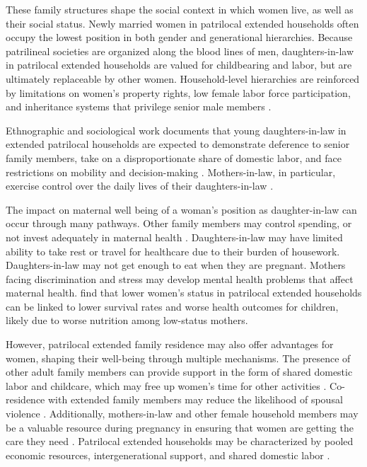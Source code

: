 \documentclass[10pt,twoside,reqno]{article}
\begin{document}
These family structures shape the social context in which women live, as well as their social status. Newly married women in patrilocal extended households often occupy the lowest position in both gender and generational hierarchies. Because patrilineal societies are organized along the blood lines of men, daughters-in-law in patrilocal extended households are valued for childbearing and labor, but are ultimately replaceable by other women. Household-level hierarchies are reinforced by limitations on women's property rights, low female labor force participation, and inheritance systems that privilege senior male members \citep{afridi2018fewer, mookerjee2019gender, reed2020labor}.

Ethnographic and sociological work documents that young daughters-in-law in extended patrilocal households are expected to demonstrate deference to senior family members, take on a disproportionate share of domestic labor, and face restrictions on mobility and decision-making \citep{mandelbaum1988women, jeffery1989labour, gupta1999lifeboat}.  Mothers-in-law, in particular, exercise control over the daily lives of their daughters-in-law \citep{desai2005women, bloom2001dimensions}. 

The impact on maternal well being of a woman's position as daughter-in-law can occur through many pathways. Other family members may control spending, or not invest adequately in maternal health \citep{ganle2015intra,raj2011abuse}. Daughters-in-law may have limited ability to take rest or travel for healthcare due to their burden of housework. Daughters-in-law may not get enough to eat when they are pregnant. Mothers facing discrimination and stress may develop mental health problems that affect maternal health. \cite{coffey2022mothers} find that lower women’s status in patrilocal extended households can be linked to lower survival rates and worse health outcomes for children, likely due to worse nutrition among low-status mothers.

However, patrilocal extended family residence may also offer advantages for women, shaping their well-being through multiple mechanisms.  The presence of other adult family members can provide support in the form of shared domestic labor and childcare, which may free up women’s time for other activities \citep{khanna2024role}. Co-residence with extended family members may reduce the likelihood of spousal violence \citep{khanna2024role, khalil2019patrilocal, allendorf2013going}. Additionally, mothers-in-law and other female household members may be a valuable resource during pregnancy in ensuring that women are getting the care they need \citep{varghese2019coresidence}.  Patrilocal extended households may be characterized by pooled economic resources, intergenerational support, and shared domestic labor \citep{wadley1988karimpur}.  
\end{document}
